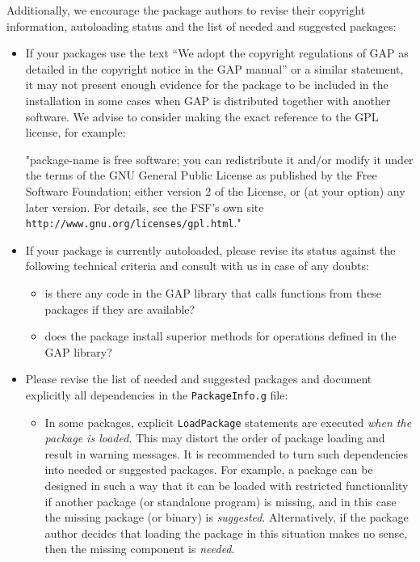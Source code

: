 \documentclass[10pt]{article}
\begin{document}
Additionally, we encourage the package authors to revise their copyright
information, autoloading status and the list of needed and suggested
packages:

\begin{itemize}

\item
If your packages use the text ``We adopt the copyright regulations of GAP as 
detailed in the copyright notice in the GAP manual'' or a similar statement, 
it may not present enough evidence for the package to be included in the 
installation in some cases when GAP is distributed together with another software. 
We advise to consider making the exact reference to the GPL license, for example: 

{\small
"{\sf package-name} is free software; you can redistribute it and/or modify it under the terms of the GNU General Public License as published by the Free Software Foundation; either version 2 of the License, or (at your option) any later version. For details, see the FSF's own site {\tt http://www.gnu.org/licenses/gpl.html}."
}


\item
If your package is currently autoloaded, please revise its status against 
the following technical criteria and consult with us in case of any doubts:
\begin{itemize}
\item
is there any code in the GAP library that calls functions from these 
packages if they are available?
\item
does the package install superior methods for operations defined in the GAP 
library?
\end{itemize}

\item
Please revise the list of needed and suggested packages and document 
explicitly all dependencies in the {\tt PackageInfo.g} file:

\begin{itemize}

\item
In some packages, explicit {\tt LoadPackage} statements are
executed \emph{when the package is loaded}. This may distort the order
of package loading and result in warning messages. It is recommended
to turn such dependencies into needed or suggested packages.
For example, a package can be designed in such a way that it can be loaded 
with restricted functionality if another package (or standalone program) 
is missing, and in this case the missing package (or binary) is \emph{suggested}.
Alternatively, if the package author decides that loading the package in
this situation makes no sense, then the missing component is \emph{needed}.


\end{itemize}
\end{itemize}
\end{document}
